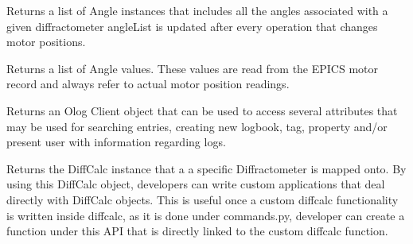 \documentclass[letterpaper,10pt,english]{sphinxmanual}
\begin{document}
\begin{fulllineitems}
\begin{fulllineitems}
\end{fulllineitems}


\begin{fulllineitems}
\label{Developer Manual:Diffractometer.Diffractometer.getAngleNames}
Returns a list of Angle instances that includes all the angles associated with a given diffractometer
angleList is updated after every operation that changes motor positions.

\end{fulllineitems}


\begin{fulllineitems}
\label{Developer Manual:Diffractometer.Diffractometer.getAngleValues}
Returns a list of Angle values. These values are read from the EPICS motor record
and always refer to actual motor position readings.

\end{fulllineitems}


\begin{fulllineitems}
\label{Developer Manual:Diffractometer.Diffractometer.getClient}
Returns an Olog Client object that can be used to access several attributes that may be used for searching entries, creating new logbook, tag, property and/or present user with information regarding logs.

\end{fulllineitems}


\begin{fulllineitems}
\label{Developer Manual:Diffractometer.Diffractometer.getDCInstance}
Returns the DiffCalc instance that a a specific Diffractometer is mapped onto. By using this DiffCalc object, developers can write custom applications that deal directly with DiffCalc objects. This is useful once a custom diffcalc functionality is written inside diffcalc, as it is done under commands.py, developer can create a function under this API that is directly linked to the custom diffcalc function.


\end{fulllineitems}
\end{fulllineitems}
\end{document}
